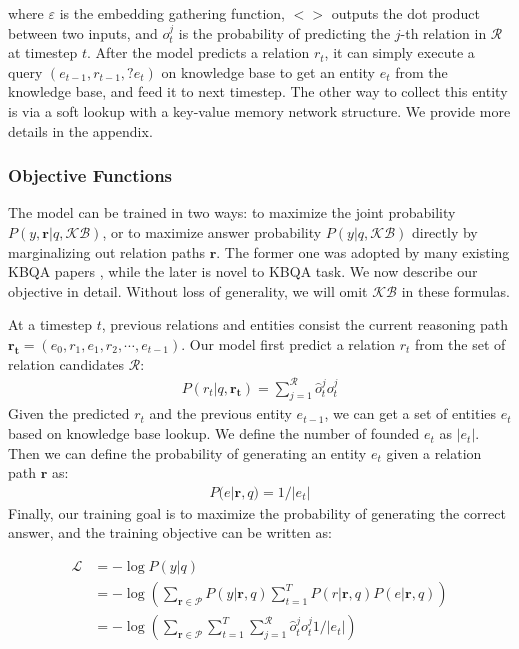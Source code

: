 where $\varepsilon$ is the embedding gathering function, $<>$ outputs the dot product between two inputs, and $o_t^j$ is the probability of predicting the $j$-th relation in $\mathcal{R}$ at timestep $t$. After the model predicts a relation $r_t$, it can simply execute a query $(e_{t-1}, r_{t-1}, ?e_t)$ on knowledge base to get an entity $e_t$ from the knowledge base, and feed it to next timestep. The other way to collect this entity is via a soft lookup with a key-value memory network structure. We provide more details in the appendix.


\subsubsection{Objective Functions}

The model can be trained in two ways: to maximize the joint probability $P(y,\mathbf{r}|q,\mathcal{KB})$, or to maximize answer probability $P(y|q,\mathcal{KB})$ directly by marginalizing out relation paths $\mathbf{r}$. The former one was adopted by many existing KBQA papers \cite{DBLP:conf/coling/ZhouHZ18}, while the later is novel to KBQA task. We now describe our objective in detail. Without loss of generality, we will omit $\mathcal{KB}$ in these formulas.

At a timestep $t$, previous relations and entities consist the current reasoning path $\mathbf{r_t} = (e_{0},r_{1},e_{1},r_{2}, \cdots,e_{t-1})$. Our model first predict a relation $r_t$ from the set of relation candidates $\mathcal{R}$:
\begin{align}
P(r_t|q,\mathbf{r_t}) = \sum_{j=1}^{\mathcal{R}}\hat{o}^j_t{o^j_t}
\end{align}
Given the predicted $r_t$ and the previous entity $e_{t-1}$, we can get a set of entities $e_t$ based on knowledge base lookup. We define the number of founded $e_t$ as $|e_t|$. Then we can define the probability of generating an entity $e_t$ given a relation path $\mathbf{r}$ as: 
\begin{align}
P(e|\mathbf{r},q) = 1/|e_t|
\end{align}
Finally, our training goal is to maximize the probability of generating the correct answer, and the training objective can be written as:

\begin{equation}
\begin{aligned}
\mathcal{L} &= -\log P(y|q) \\
            &= -\log(\sum_{\mathbf{r}\in \mathcal{P}} P(y|\mathbf{r},q)\sum_{t=1}^T P(r|\mathbf{r},q)P(e|\mathbf{r},q))\\
            &= -\log(\sum_{\mathbf{r}\in \mathcal{P}} \sum_{t=1}^T\sum_{j=1}^{\mathcal{R}}\hat{o}^j_t{o^j_t} 1/|e_t|)
\end{aligned}
\label{obj:latent}
\end{equation}


